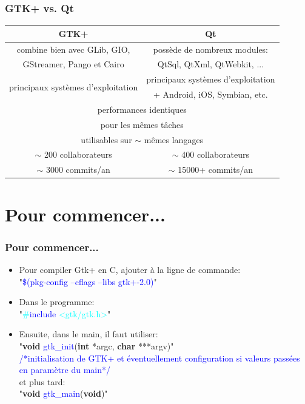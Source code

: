 \documentclass{beamer}
\begin{document}
\begin{frame}
  \frametitle{GTK+ vs. Qt}
  \begin{tabular}{|c|c|}
  \hline
  GTK+ & Qt \\
  \hline \hline 
  combine bien avec GLib, GIO, & possède de nombreux modules: \\
  GStreamer, Pango et Cairo & QtSql, QtXml, QtWebkit, ... \\
  \hline
  \multirow{2}{*}{principaux systèmes d'exploitation} & principaux systèmes d'exploitation\\
   & + Android, iOS, Symbian, etc.\\
  \hline
  \multicolumn{2}{|c|}{performances identiques}\\
  \multicolumn{2}{|c|}{pour les mêmes tâches}\\
  \hline
  \multicolumn{2}{|c|}{utilisables sur $\sim$ mêmes langages}\\
  \hline
  $\sim$ 200 collaborateurs & $\sim$ 400 collaborateurs\\
  $\sim$ 3000 commits/an & $\sim$ 15000+ commits/an\\
  \hline
  \end{tabular}
\end{frame}

\section{Pour commencer...}

\begin{frame}
  \frametitle{Pour commencer...}
  \begin{itemize}
  \item Pour compiler Gtk+ en C, ajouter à la ligne de commande: \\
  \hspace{1cm}"\textcolor{blue}{\$(pkg-config --cflags --libs gtk+-2.0)}"
  \item Dans le programme: \\
  \hspace{1cm}"\textcolor{cyan}{\#}\textcolor{blue}{include} \textcolor{cyan}{<gtk/gtk.h>}"
  \item Ensuite, dans le main, il faut utiliser:\\
  \hspace{1cm}"\textbf{void} \textcolor{blue}{gtk\_init}(\textbf{int} *argc, \textbf{char} ***argv)"\\
  \textcolor{blue}{/*initialisation de GTK+ et éventuellement configuration si valeurs passées en paramètre du main*/}\\
  et plus tard:\\
  \hspace{1cm}"\textbf{void} \textcolor{blue}{gtk\_main}(\textbf{void})"\\
  \end{itemize}
\end{frame}
\end{document}
